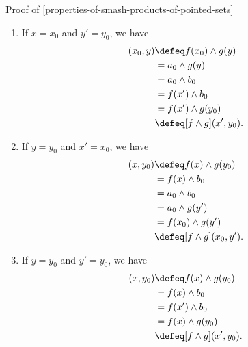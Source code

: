 \begin{Proof}{Proof of \cref{properties-of-smash-products-of-pointed-sets}}
\begin{enumerate}
\begin{align*}
                                     &=      f(x_{0})\wedge g(y')\\%
                                     &\defeq [f\wedge g](x_{0},y').%
            \end{align*}
        \item If $x=x_{0}$ and $y'=y_{0}$, we have 
            \begin{align*}
                [f\wedge g](x_{0},y) &\defeq f(x_{0})\wedge g(y)\\%
                                     &=      a_{0}\wedge g(y)\\%
                                     &=      a_{0}\wedge b_{0}\\%
                                     &=      f(x')\wedge b_{0}\\%
                                     &=      f(x')\wedge g(y_{0})\\%
                                     &\defeq [f\wedge g](x',y_{0}).%
            \end{align*}
        \item If $y=y_{0}$ and $x'=x_{0}$, we have 
            \begin{align*}
                [f\wedge g](x,y_{0}) &\defeq f(x)\wedge g(y_{0})\\%
                                     &=      f(x)\wedge b_{0}\\%
                                     &=      a_{0}\wedge b_{0}\\%
                                     &=      a_{0}\wedge g(y')\\%
                                     &=      f(x_{0})\wedge g(y')\\%
                                     &\defeq [f\wedge g](x_{0},y').%
            \end{align*}
        \item If $y=y_{0}$ and $y'=y_{0}$, we have 
            \begin{align*}
                [f\wedge g](x,y_{0}) &\defeq f(x)\wedge g(y_{0})\\%
                                     &=      f(x)\wedge b_{0}\\%
                                     &=      f(x')\wedge b_{0}\\%
                                     &=      f(x)\wedge g(y_{0})\\%
                                     &\defeq [f\wedge g](x',y_{0}).%
            \end{align*}

\end{enumerate}
\end{Proof}
